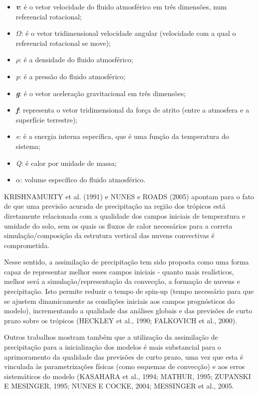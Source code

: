 \begin{itemize}
\item \textbf{\textit{v}}: é o vetor velocidade do fluido atmosférico em três dimensões, num referencial rotacional;
\item $\Omega$: é o vetor tridimensional velocidade angular (velocidade com a qual o referencial rotacional se move);
\item $\rho$: é a densidade do fluido atmosférico;
\item \textit{p}: é a pressão do fluido atmosférico;
\item \textbf{\textit{g}}: é o vetor aceleração gravitacional em três dimensões;
\item \textbf{\textit{f}}: representa o vetor tridimensional da força de atrito (entre a atmosfera e a superfície terrestre);
\item \textit{e}: é a energia interna específica, que é uma função da temperatura do sistema;
\item \textit{Q}: é calor por unidade de massa;
\item $\alpha$: volume específico do fluido atmosférico. 
\end{itemize}

KRISHNAMURTY et al. (1991) e NUNES e ROADS (2005) apontam para o fato de que uma previsão acurada de precipitação na região dos trópicos está diretamente relacionada com a qualidade dos campos iniciais de temperatura e umidade do solo, sem os quais os fluxos de calor necessários para a correta simulação/composição da estrutura vertical das nuvens convectivas é comprometida.

Nesse sentido, a assimilação de precipitação tem sido proposta como uma forma capaz de representar melhor esses campos iniciais - quanto mais realísticos, melhor será a simulação/representação da convecção, a formação de nuvens e precipitação. Isto permite reduzir o tempo de spin-up (tempo necessário para que se ajustem dinamicamente as condições iniciais aos campos prognósticos do modelo), incrementando a qualidade das análises globais e das previsões de curto prazo sobre os trópicos (HECKLEY et al., 1990; FALKOVICH et al., 2000).

Outros trabalhos mostram também que a utilização da assimilação de precipitação para a inicialização dos modelos é mais substancial para o aprimoramento da qualidade das previsões de curto prazo, uma vez que esta é vinculada às parametrizações físicas (como esquemas de convecção) e aos erros sistemáticos do modelo (KASAHARA et al., 1994; MATHUR, 1995; ZUPANSKI E MESINGER, 1995; NUNES E COCKE, 2004; MESSINGER et al., 2005.


